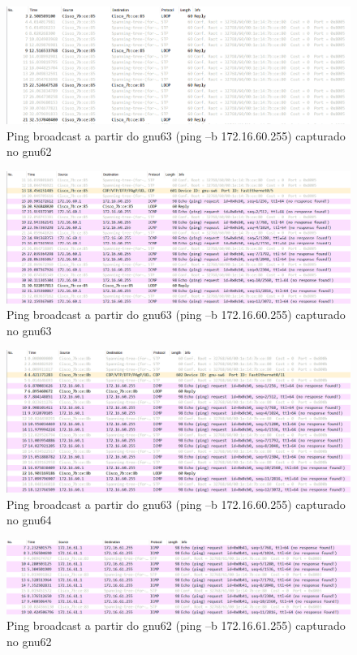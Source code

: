 \documentclass[article, a4paper, 11pt, oneside]{memoir}
\begin{document}
\newpage
\begin{figure}[h]
	\centering
\includegraphics[scale=0.55]{exp2-step8-broadcast-gnu63-from-gnu62.png}
\caption{Ping broadcast a partir do gnu63 (ping –b 172.16.60.255) capturado no gnu62}
\end{figure}

\begin{figure}[h]
	\centering
\includegraphics[scale=0.55]{exp2-step8-broadcast-gnu63-from-gnu63.png}
\caption{Ping broadcast a partir do gnu63 (ping –b 172.16.60.255) capturado no gnu63}
\end{figure}

\begin{figure}[h]
	\centering
\includegraphics[scale=0.55]{exp2-step8-broadcast-gnu63-from-gnu64.png}
\caption{Ping broadcast a partir do gnu63 (ping –b 172.16.60.255) capturado no gnu64}
\end{figure}

\newpage
\begin{figure}[h]
	\centering
\includegraphics[scale=0.55]{exp2-step10-broadcast-gnu62-from-gnu62.png}
\caption{Ping broadcast a partir do gnu62 (ping –b 172.16.61.255) capturado no gnu62}
\end{figure}
\end{document}
